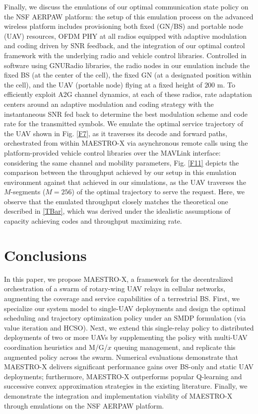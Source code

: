 \documentclass[12pt, draftcls, onecolumn]{IEEEtran}
\theoremstyle{plain}
\theoremstyle{definition}
\theoremstyle{remark}
\begin{document}
Finally, we discuss the emulations of our optimal communication state policy on the NSF AERPAW platform: the setup of this emulation process on the advanced wireless platform includes provisioning both fixed (GN/BS) and portable node (UAV) resources, OFDM PHY at all radios equipped with adaptive modulation and coding driven by SNR feedback, and the integration of our optimal control framework with the underlying radio and vehicle control libraries. Controlled in software using GNURadio libraries, the radio nodes in our emulation include the fixed BS (at the center of the cell), the fixed GN (at a designated position within the cell), and the UAV (portable node) flying at a fixed height of $200$ m. To efficiently exploit A2G channel dynamics, at each of these radios, rate adaptation centers around an adaptive modulation and coding strategy with the instantaneous SNR fed back to determine the best modulation scheme and code rate for the transmitted symbols. We emulate the optimal service trajectory of the UAV shown in Fig. \ref{F7}, as it traverses its decode and forward paths, orchestrated from within MAESTRO-X via asynchronous remote calls using the platform-provided vehicle control libraries over the MAVLink interface: considering the same channel and mobility parameters, Fig. \ref{F11} depicts the comparison between the throughput achieved by our setup in this emulation environment against that achieved in our simulations, as the UAV traverses the $M$-segments ($M{=}256$) of the optimal trajectory to serve the request. Here, we observe that the emulated throughput closely matches the theoretical one described in \eqref{TBar}, which was derived under the idealistic assumptions of capacity achieving codes and throughput maximizing rate.
\vspace{-4mm}


\section{Conclusions}\label{S7}
\vspace{-2mm}

In this paper, we propose MAESTRO-X, a framework for the decentralized orchestration of a swarm of rotary-wing UAV relays in cellular networks, augmenting the coverage and service capabilities of a terrestrial BS. First, we specialize our system model to single-UAV deployments and design the optimal scheduling and trajectory optimization policy under an SMDP formulation (via value iteration and HCSO). Next, we extend this single-relay policy to distributed deployments of two or more UAVs by supplementing the policy with multi-UAV coordination heuristics and M/G/$x$ queuing management, and replicate this augmented policy across the swarm. Numerical evaluations demonstrate that MAESTRO-X delivers significant performance gains over BS-only and static UAV deployments; furthermore, MAESTRO-X outperforms popular Q-learning and successive convex approximation strategies in the existing literature. Finally, we demonstrate the integration and implementation viability of MAESTRO-X through emulations on the NSF AERPAW platform.
\vspace{-4mm}



 
\end{document}
